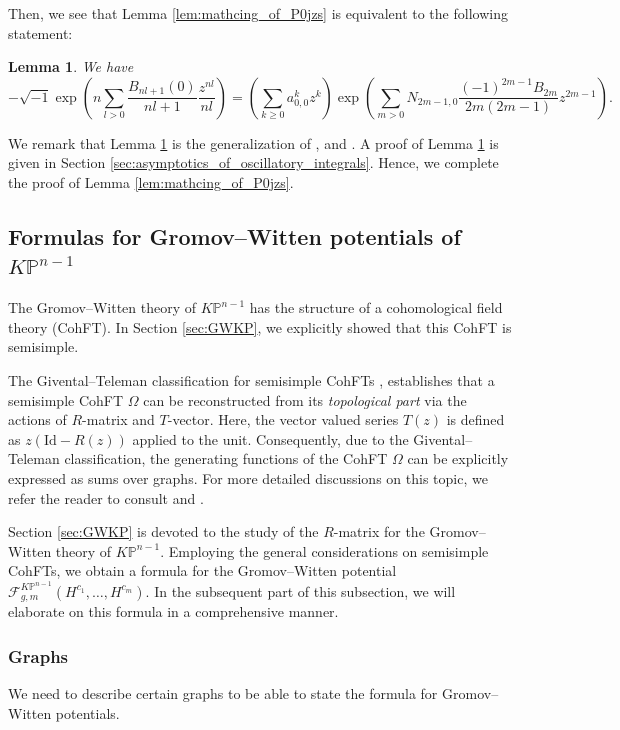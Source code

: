 \documentclass[12pt]{amsart}
\newtheorem{lem}[prop]{Lemma}
\numberwithin{equation}{section}
\newcommand{\KP}{K\mathbb{P}}
\begin{document}
Then, we see that Lemma \ref{lem:mathcing_of_P0jzs} is equivalent to the following statement:
\begin{lem}\label{lem:Final_of_proof_strategy}
We have
\begin{equation}\label{eqn:R_matrix_identity}
-\sqrt{-1}\exp\left(n\sum_{l>0}\frac{B_{nl+1}\left(0\right)}{nl+1}\frac{z^{nl}}{nl} \right)
=\left(\sum_{k\geq{0}}a_{0,0}^kz^k\right)\exp\left(\sum_{m>0}N_{2m-1, 0}\frac{(-1)^{2m-1}B_{2m}}{2m(2m-1)}z^{2m-1}\right).
\end{equation}
\end{lem}
We remark that Lemma \ref{lem:Final_of_proof_strategy} is the generalization of \cite[Lemma 22]{lho-p2}, and \cite[Proposition 11]{lho}. A proof of Lemma \ref{lem:Final_of_proof_strategy} is given in Section \ref{sec:asymptotics_of_oscillatory_integrals}. Hence, we complete the proof of Lemma \ref{lem:mathcing_of_P0jzs}.




\subsection{Formulas for Gromov--Witten potentials of \texorpdfstring{$\KP^{n-1}$}{KP{n-1}}}\label{sec:formulaGW}

The Gromov--Witten theory of $\KP^{n-1}$ has the structure of a cohomological field theory (CohFT). In Section \ref{sec:GWKP}, we explicitly showed that this CohFT is semisimple.

The Givental--Teleman classification for semisimple CohFTs \cite{g3}, \cite{t} establishes that a semisimple CohFT $\Omega$ can be reconstructed from its \textit{topological part} via the actions of $R$-matrix and $T$-vector. Here, the vector valued series $T(z)$ is defined as $z(\text{Id}-R(z))$ applied to the unit. Consequently, due to the Givental--Teleman classification, the generating functions of the CohFT $\Omega$ can be explicitly expressed as sums over graphs. For more detailed discussions on this topic, we refer the reader to consult \cite{Picm} and \cite{ppz}.

Section \ref{sec:GWKP} is devoted to the study of the $R$-matrix for the Gromov--Witten theory of $\KP^{n-1}$. Employing the general considerations on semisimple CohFTs, we obtain a formula for the Gromov--Witten potential $\mathcal{F}_{g, m}^{\KP^{n-1}}\left(H^{c_{1}}, \ldots, H^{c_{m}}\right)$. In the subsequent part of this subsection, we will elaborate on this formula in a comprehensive manner.
\subsubsection{Graphs}
We need to describe certain graphs to be able to state the formula for Gromov--Witten potentials.
\end{document}
